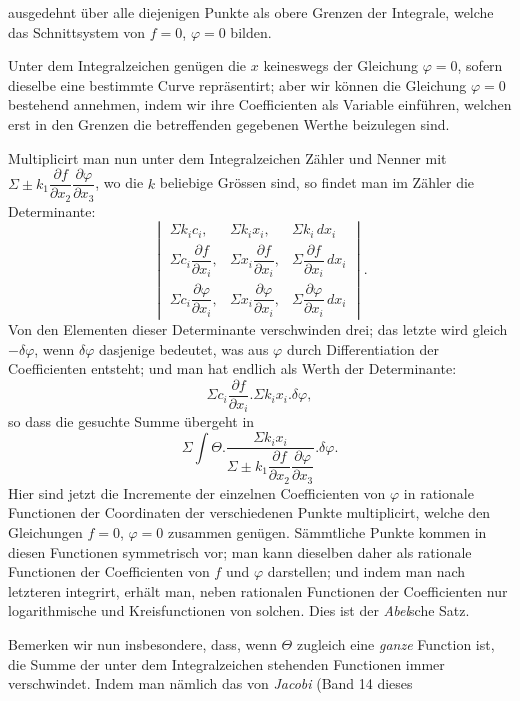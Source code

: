 \documentclass{article}
\begin{document}
ausgedehnt über alle diejenigen Punkte als obere Grenzen der Integrale, welche das Schnittsystem von $f = 0$, $\varphi = 0$ bilden.

Unter dem Integralzeichen genügen die $x$ keineswegs der Gleichung $\varphi = 0$, sofern dieselbe eine bestimmte Curve repräsentirt; aber wir können die Gleichung $\varphi = 0$ bestehend annehmen, indem wir ihre Coefficienten als Variable einführen, welchen erst in den Grenzen die betreffenden gegebenen Werthe beizulegen sind.

Multiplicirt man nun unter dem Integralzeichen Zähler und Nenner mit $\Sigma\pm k_{1}\dfrac{\partial f}{\partial x_{2}}\dfrac{\partial \varphi}{\partial x_{3}}$, wo die $k$ beliebige Grössen sind, so findet man im Zähler die Determinante:
\[
\begin{vmatrix}
\Sigma k_{i}c_{i}, & \Sigma k_{i}x_{i}, & \Sigma k_{i}\,dx_{i} \\[4pt]
\Sigma c_{i}\dfrac{\partial f}{\partial x_{i}}, & \Sigma x_{i}\dfrac{\partial f}{\partial x_{i}}, & \Sigma \dfrac{\partial f}{\partial x_{i}}\,dx_{i} \\[4pt]
\Sigma c_{i}\dfrac{\partial \varphi}{\partial x_{i}}, & \Sigma x_{i}\dfrac{\partial \varphi}{\partial x_{i}}, & \Sigma \dfrac{\partial \varphi}{\partial x_{i}}\,dx_{i}
\end{vmatrix}.
\]
Von den Elementen dieser Determinante verschwinden drei; das letzte wird gleich $-\delta\varphi$, wenn $\delta\varphi$ dasjenige bedeutet, was aus $\varphi$ durch Differentiation der Coefficienten entsteht; und man hat endlich als Werth der Determinante:
\[ \Sigma c_{i}\frac{\partial f}{\partial x_{i}}.\Sigma k_{i}x_{i}.\delta\varphi, \]
so dass die gesuchte Summe übergeht in
\[ \Sigma\int \Theta.\frac{\Sigma k_{i}x_{i}}{\Sigma\pm k_{1}\dfrac{\partial f}{\partial x_{2}}\dfrac{\partial \varphi}{\partial x_{3}}}.\delta\varphi. \]
Hier sind jetzt die Incremente der einzelnen Coefficienten von $\varphi$ in rationale Functionen der Coordinaten der verschiedenen Punkte multiplicirt, welche den Gleichungen $f = 0$, $\varphi = 0$ zusammen genügen. Sämmtliche Punkte kommen in diesen Functionen symmetrisch vor; man kann dieselben daher als rationale Functionen der Coefficienten von $f$ und $\varphi$ darstellen; und indem man nach letzteren integrirt, erhält man, neben rationalen Functionen der Coefficienten nur logarithmische und Kreisfunctionen von solchen. Dies ist der \emph{Abel}sche Satz.

Bemerken wir nun insbesondere, dass, wenn $\Theta$ zugleich eine \emph{ganze} Function ist, die Summe der unter dem Integralzeichen stehenden Functionen immer verschwindet. Indem man nämlich das von \emph{Jacobi} (Band 14 dieses
\end{document}
